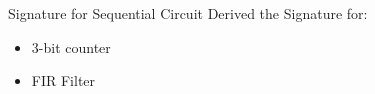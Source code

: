 \documentclass[aspectratio=1610]{beamer}
\newcommand{\semitransp}[2][35]{\color{fg!#1}#2}
\begin{document}

\begin{frame}{Signature for Sequential Circuit}
\vspace{-3cm}
Derived the Signature for: 

\begin{itemize}

\item 3-bit counter
\item FIR Filter

\end{itemize}

\end{frame}
\end{document}
